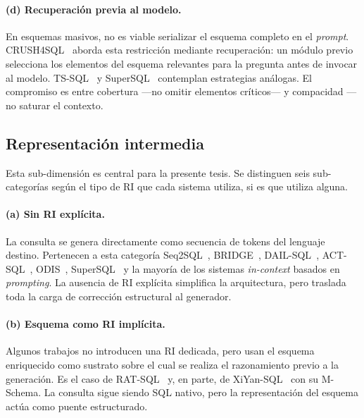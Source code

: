 \paragraph{(d) Recuperación previa al modelo.} En esquemas masivos, no
es viable serializar el esquema completo en el \emph{prompt}.
CRUSH4SQL~\cite{CRUSH4SQL2023} aborda esta restricción mediante
recuperación: un módulo previo selecciona los elementos del esquema
relevantes para la pregunta antes de invocar al modelo.
TS-SQL~\cite{TS-SQL2025} y SuperSQL~\cite{SuperSQL2024} contemplan
estrategias análogas. El compromiso es entre cobertura ---no omitir
elementos críticos--- y compacidad ---no saturar el contexto.

\subsection{Representación intermedia}
\label{subsec:sota-d3b-ir}

Esta sub-dimensión es central para la presente tesis. Se distinguen seis
sub-categorías según el tipo de RI que cada sistema utiliza, si es que
utiliza alguna.

\paragraph{(a) Sin RI explícita.} La consulta se genera directamente como
secuencia de tokens del lenguaje destino. Pertenecen a esta categoría
Seq2SQL~\cite{Seq2SQL2017}, BRIDGE~\cite{BRIDGE2020},
DAIL-SQL~\cite{DAIL-SQL2023}, ACT-SQL~\cite{ACT-SQL2023},
ODIS~\cite{ODIS2023}, SuperSQL~\cite{SuperSQL2024} y la mayoría de los
sistemas \emph{in-context} basados en \emph{prompting}. La ausencia de
RI explícita simplifica la arquitectura, pero traslada toda la carga de
corrección estructural al generador.

\paragraph{(b) Esquema como RI implícita.} Algunos trabajos no introducen
una RI dedicada, pero usan el esquema enriquecido como sustrato sobre el
cual se realiza el razonamiento previo a la generación. Es el caso de
RAT-SQL~\cite{RAT-SQL2021} y, en parte, de XiYan-SQL~\cite{XiYan-SQL2024}
con su M-Schema. La consulta sigue siendo SQL nativo, pero la
representación del esquema actúa como puente estructurado.

